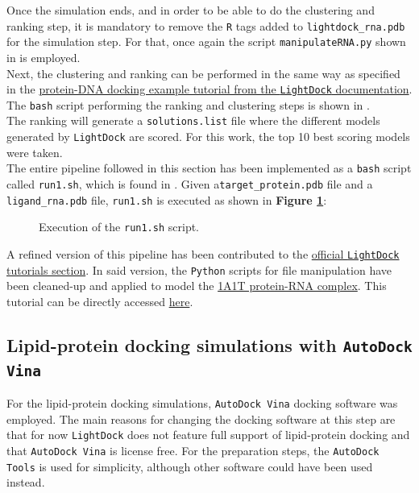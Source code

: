 Once the simulation ends, and in order to be able to do the clustering and ranking step, it is mandatory to remove the \texttt{R} tags added to \texttt{lightdock\_rna.pdb} for the simulation step. For that, once again the script \texttt{manipulateRNA.py} shown in \textbf{} is employed.\\

Next, the clustering and ranking can be performed in the same way as specified in the \href{https://lightdock.org/tutorials/0.9.3/dna_docking}{protein-DNA docking example tutorial from the \texttt{LightDock} documentation}. The \texttt{bash} script performing the ranking and clustering steps is shown in \textbf{}.\\

The ranking will generate a \texttt{solutions.list} file where the different models generated by \texttt{LightDock} are scored. For this work, the top 10 best scoring models were taken.\\

The entire pipeline followed in this section has been implemented as a \texttt{bash} script called \texttt{run1.sh}, which is found in \textbf{}. Given a\linebreak\texttt{target\_protein.pdb} file and a \texttt{ligand\_rna.pdb} file, \texttt{run1.sh} is executed as shown in \textbf{Figure \ref{fig:execrun1}}:

\begin{figure}[htbp!]
    
    \caption[Execution of the \texttt{run1.sh} script.]{Execution of the \texttt{run1.sh} script.}
    \label{fig:execrun1}
\end{figure}

A refined version of this pipeline has been contributed to the \href{https://lightdock.org/tutorials/0.9.3/index.html}{official \texttt{LightDock} tutorials section}. In said version, the \texttt{Python} scripts for file manipulation have been cleaned-up and applied to model the \href{https://www.rcsb.org/structure/1a1t}{1A1T protein-RNA complex}. This tutorial can be directly accessed \href{https://lightdock.org/tutorials/0.9.3/rna_docking}{here}.

\subsection{Lipid-protein docking simulations with \texttt{AutoDock Vina}}

For the lipid-protein docking simulations, \texttt{AutoDock Vina} docking software was employed. The main reasons for changing the docking software at this step are that for now \texttt{LightDock} does not feature full support of lipid-protein docking and that \texttt{AutoDock Vina} is license free. For the preparation steps, the \texttt{AutoDock Tools} is used for simplicity, although other software could have been used instead.


